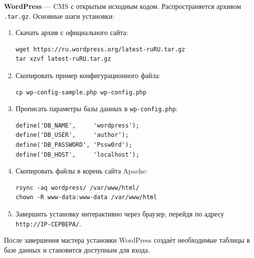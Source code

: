 \textbf{WordPress} --- CMS с открытым исходным кодом. Распространяется
архивом \texttt{.tar.gz}. Основные шаги установки:
\begin{enumerate}
  \item Скачать архив с официального сайта:
\begin{lstlisting}
wget https://ru.wordpress.org/latest-ruRU.tar.gz
tar xzvf latest-ruRU.tar.gz
\end{lstlisting}
  \item Скопировать пример конфигурационного файла:
\begin{lstlisting}
cp wp-config-sample.php wp-config.php
\end{lstlisting}
  \item Прописать параметры базы данных в \texttt{wp-config.php}:
\begin{lstlisting}
define('DB_NAME',     'wordpress');
define('DB_USER',     'author');
define('DB_PASSWORD', 'Pssw0rd');
define('DB_HOST',     'localhost');
\end{lstlisting}
  \item Скопировать файлы в корень сайта Apache:
\begin{lstlisting}
rsync -aq wordpress/ /var/www/html/
chown -R www-data:www-data /var/www/html
\end{lstlisting}
  \item Завершить установку интерактивно через браузер,
        перейдя по адресу \texttt{http://IP-СЕРВЕРА/}.
\end{enumerate}

После завершения мастера установки WordPress создаёт необходимые
таблицы в базе данных и становится доступным для входа.

\endinput
